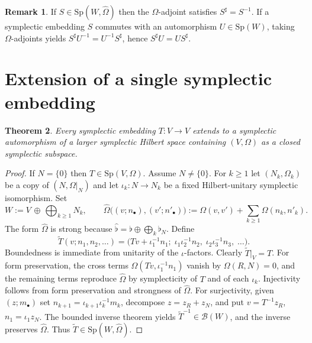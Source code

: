 \documentclass[11pt,a4paper]{article}
\newtheorem{theorem}{Theorem}[section]
\theoremstyle{definition}
\newtheorem{remark}[theorem]{Remark}
\begin{document}
\begin{remark}
\label{rem:adjoint}
If \(S\in\mathrm{Sp}(W,\widehat{\Omega})\) then the \(\Omega\)-adjoint satisfies \(S^\sharp=S^{-1}\).
If a symplectic embedding \(S\) commutes with an automorphism \(U\in\mathrm{Sp}(W)\), taking
\(\Omega\)-adjoints yields \(S^\sharp U^{-1}=U^{-1}S^\sharp\), hence \(S^\sharp U=US^\sharp\).
\end{remark}

\section{Extension of a single symplectic embedding}

\begin{theorem}
\label{thm:A}
Every symplectic embedding \(T:V\to V\) extends to a symplectic automorphism of a larger
symplectic Hilbert space containing \((V,\Omega)\) as a closed symplectic subspace.
\end{theorem}

\begin{proof}
If \(N=\{0\}\) then \(T\in\mathrm{Sp}(V,\Omega)\). Assume \(N\neq\{0\}\). For \(k\ge 1\) let
\((N_k,\Omega_k)\) be a copy of \((N,\Omega|_N)\) and let \(\iota_k:N\to N_k\) be a fixed
Hilbert-unitary symplectic isomorphism. Set
\[
W:=V\,\oplus\,\bigoplus_{k\ge 1}N_k,
\qquad
\widehat{\Omega}\bigl((v;n_\bullet),(v';n'_\bullet)\bigr)
:=\Omega(v,v')+\sum_{k\ge 1}\Omega(n_k,n'_k).
\]
The form \(\widehat{\Omega}\) is strong because \(\widehat{\flat}=\flat\oplus\bigoplus_k\flat_N\).
Define
\begin{equation}
\label{eq:Ttil}
\widetilde{T}(v;n_1,n_2,\dots)
=\bigl(Tv+\iota_1^{-1}n_1;\;
\iota_1\iota_2^{-1}n_2,\;
\iota_2\iota_3^{-1}n_3,\;\dots\bigr).
\end{equation}
Boundedness is immediate from unitarity of the \(\iota\)-factors. Clearly
\(\widetilde{T}|_V=T\). For form preservation, the cross terms \(\Omega(Tv,\iota_1^{-1}n_1)\) vanish
by \(\Omega(R,N)=0\), and the remaining terms reproduce \(\widehat{\Omega}\) by symplecticity of
\(T\) and of each \(\iota_k\). Injectivity follows from form preservation and strongness of
\(\widehat{\Omega}\). For surjectivity, given \((z;m_\bullet)\) set
\(n_{k+1}=\iota_{k+1}\iota_k^{-1}m_k\), decompose \(z=z_R+z_N\), and put \(v=T^{-1}z_R\),
\(n_1=\iota_1 z_N\). The bounded inverse theorem yields \(\widetilde{T}^{-1}\in\mathcal{B}(W)\), and
the inverse preserves \(\widehat{\Omega}\). Thus \(\widetilde{T}\in\mathrm{Sp}(W,\widehat{\Omega})\).
\end{proof}
\end{document}
